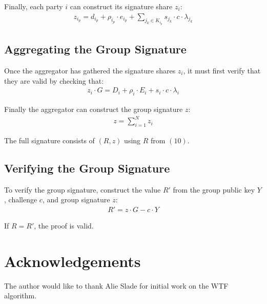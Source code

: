 \documentclass{article}
\begin{document}
Finally, each party $i$ can construct its signature share $z_i$:
\begin{align}
  z_{i_p} = d_{i_p} + \rho_{i_p} \cdot e_{i_p} + \sum_{j_k \in K_{i_p}}^{} s_{j_k} \cdot c \cdot \lambda_{j_k}
\end{align}


\subsection{
  Aggregating the Group Signature
}

Once the aggregator has gathered the signature shares $z_i$, it must first verify that they are valid by checking that:
\begin{align}
  z_i \cdot G = D_i + \rho_i \cdot E_i + s_i \cdot c \cdot \lambda_i
\end{align}

Finally the aggregator can construct the group signature $z$:
\begin{align}
  z = \sum_{i=1}^{N} z_i
\end{align}

The full signature consists of $(R, z)$ using $R$ from $(10)$.

\subsection{
  Verifying the Group Signature
}

To verify the group signature, construct the value $R'$ from the group public key $Y$, challenge $c$, and group signature $z$:
\begin{align}
  R' = z \cdot G - c \cdot Y
\end{align}

If $R = R'$, the proof is valid.

\newpage
\onecolumn

\section{
  Acknowledgements
}

The author would like to thank Alie Slade for initial work on the WTF algorithm.
\end{document}
